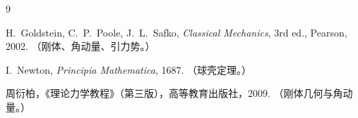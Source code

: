 \documentclass[UTF8,a4paper,11pt]{ctexart}
\begin{document}
\begin{thebibliography}{9}

H.~Goldstein, C.~P.~Poole, J.~L.~Safko,
\emph{Classical Mechanics}, 3rd ed., Pearson, 2002.
（刚体、角动量、引力势。）

I.~Newton, \emph{Principia Mathematica}, 1687.
（球壳定理。）

周衍柏，《理论力学教程》（第三版），高等教育出版社，2009.
（刚体几何与角动量。）

\end{thebibliography}
\end{document}
